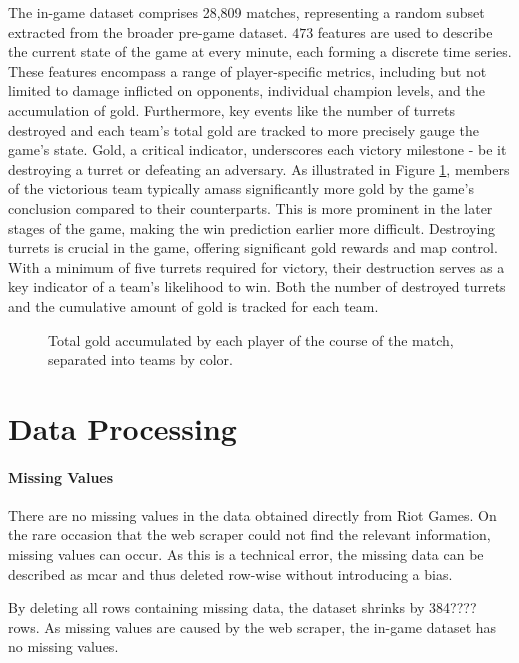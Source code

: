 \documentclass[12pt, a4paper, headinclude, twoside, plainheadsepline, open=right, numbers=noenddot, hidelinks, toc=listof, toc=bibliography]{scrreprt}
\begin{document}
The in-game dataset comprises 28,809 matches, representing a random subset extracted from the broader pre-game dataset.
$473$ features are used to describe the current state of the game at every minute, each forming a discrete time series.
These features encompass a range of player-specific metrics, including but not limited to damage inflicted on opponents, individual champion levels, and the accumulation of gold.
Furthermore, key events like the number of turrets destroyed and each team's total gold are tracked to more precisely gauge the game's state. 
Gold, a critical indicator, underscores each victory milestone - be it destroying a turret or defeating an adversary. 
As illustrated in Figure \ref{fig:totalGold}, members of the victorious team typically amass significantly more gold by the game's conclusion compared to their counterparts.
This is more prominent in the later stages of the game, making the win prediction earlier more difficult.
Destroying turrets is crucial in the game, offering significant gold rewards and map control. 
With a minimum of five turrets required for victory, their destruction serves as a key indicator of a team's likelihood to win.
Both the number of destroyed turrets and the cumulative amount of gold is tracked for each team.

\begin{figure}

\caption{Total gold accumulated by each player of the course of the match, separated into teams by color. }
\label{fig:totalGold}
\end{figure}


\section{Data Processing}
\label{sec:data_processing}

\paragraph{Missing Values}
There are no missing values in the data obtained directly from Riot Games.
On the rare occasion that the web scraper could not find the relevant information, missing values can occur.
As this is a technical error, the missing data can be described as \ac{mcar} \cite{acockWorkingMissingValues2005} and thus deleted row-wise without introducing a bias.

By deleting all rows containing missing data, the dataset shrinks by 384???? rows.
As missing values are caused by the web scraper, the in-game dataset has no missing values.
\end{document}
